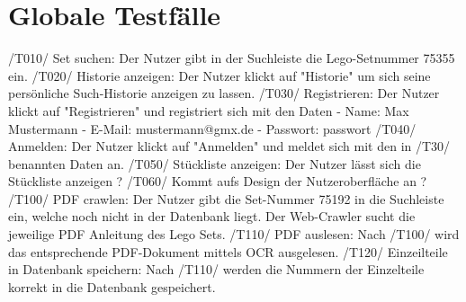 \section{Globale Testfälle}
/T010/\newline 
Set suchen: Der Nutzer gibt in der Suchleiste die Lego-Setnummer 75355 ein. \newline
\newline
/T020/ \newline Historie anzeigen: Der Nutzer klickt auf "Historie" um sich seine persönliche Such-Historie anzeigen zu lassen. \newline
\newline
/T030/ \newline Registrieren: Der Nutzer klickt auf "Registrieren" und registriert sich mit den Daten \newline           
- Name: Max Mustermann \newline
- E-Mail: mustermann@gmx.de \newline                               
- Passwort: passwort \newline
\newline
/T040/ \newline 
Anmelden:  Der Nutzer klickt auf "Anmelden" und meldet sich mit den in /T30/ benannten Daten an.\newline
\newline
/T050/ \newline 
Stückliste anzeigen: Der Nutzer lässt sich die Stückliste anzeigen ? \newline
\newline
/T060/ \newline
Kommt aufs Design der Nutzeroberfläche an ?  \newline
\newline
/T100/ \newline
PDF crawlen: Der Nutzer gibt die Set-Nummer 75192 in die Suchleiste ein, welche noch nicht in der Datenbank liegt. Der Web-Crawler sucht die jeweilige PDF Anleitung des Lego Sets. \newline
\newline
/T110/ \newline
PDF auslesen: Nach /T100/ wird das entsprechende PDF-Dokument mittels OCR ausgelesen. \newline
\newline
/T120/ \newline
Einzeilteile in Datenbank speichern: Nach /T110/  werden die Nummern der Einzelteile korrekt in die Datenbank gespeichert. \newline
